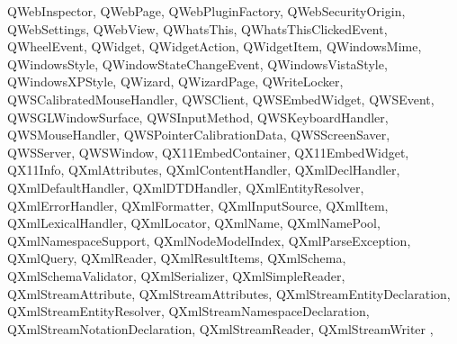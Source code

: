 {{        QWebInspector,
        QWebPage,
        QWebPluginFactory,
        QWebSecurityOrigin,
        QWebSettings,
        QWebView,
        QWhatsThis,
        QWhatsThisClickedEvent,
        QWheelEvent,
        QWidget,
        QWidgetAction,
        QWidgetItem,
        QWindowsMime,
        QWindowsStyle,
        QWindowStateChangeEvent,
        QWindowsVistaStyle,
        QWindowsXPStyle,
        QWizard,
        QWizardPage,
        QWriteLocker,
        QWSCalibratedMouseHandler,
        QWSClient,
        QWSEmbedWidget,
        QWSEvent,
        QWSGLWindowSurface,
        QWSInputMethod,
        QWSKeyboardHandler,
        QWSMouseHandler,
        QWSPointerCalibrationData,
        QWSScreenSaver,
        QWSServer,
        QWSWindow,
        QX11EmbedContainer,
        QX11EmbedWidget,
        QX11Info,
        QXmlAttributes,
        QXmlContentHandler,
        QXmlDeclHandler,
        QXmlDefaultHandler,
        QXmlDTDHandler,
        QXmlEntityResolver,
        QXmlErrorHandler,
        QXmlFormatter,
        QXmlInputSource,
        QXmlItem,
        QXmlLexicalHandler,
        QXmlLocator,
        QXmlName,
        QXmlNamePool,
        QXmlNamespaceSupport,
        QXmlNodeModelIndex,
        QXmlParseException,
        QXmlQuery,
        QXmlReader,
        QXmlResultItems,
        QXmlSchema,
        QXmlSchemaValidator,
        QXmlSerializer,
        QXmlSimpleReader,
        QXmlStreamAttribute,
        QXmlStreamAttributes,
        QXmlStreamEntityDeclaration,
        QXmlStreamEntityResolver,
        QXmlStreamNamespaceDeclaration,
        QXmlStreamNotationDeclaration,
        QXmlStreamReader,
        QXmlStreamWriter
    },
}